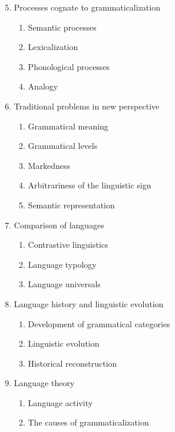 \begin{refsection}


\renewcommand{\labelenumii}{\arabic{enumi}.\arabic{enumii}.}
\begin{enumerate}
\setcounter{enumi}{4}
\item Processes cognate to grammaticalization
	\begin{enumerate} \parskip0pt
	\item Semantic processes
	\item Lexicalization
	\item Phonological processes
	\item Analogy
	\end{enumerate}
\item Traditional problems in new perspective
	\begin{enumerate} \parskip0pt
	\item Grammatical meaning
	\item Grammatical levels
	\item Markedness
	\item Arbitrariness of the linguistic sign
	\item Semantic representation
	\end{enumerate} \parskip0pt
\item Comparison of languages
	\begin{enumerate} \parskip0pt
	\item Contrastive linguistics
	\item Language typology
	\item Language universals
	\end{enumerate}
\item Language history and linguistic evolution
	\begin{enumerate} \parskip0pt
	\item Development of grammatical categories
	\item Linguistic evolution
	\item Historical reconstruction
	\end{enumerate}
\item Language theory
	\begin{enumerate} \parskip0pt
	\item Language activity
	\item The causes of grammaticalization
	\end{enumerate}
\end{enumerate}

\end{refsection}
